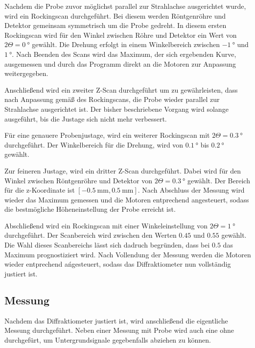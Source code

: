 Nachdem die Probe zuvor möglichst parallel zur Strahlachse ausgerichtet wurde,
wird ein Rockingscan durchgeführt. Bei diesem werden Röntgenröhre und
Detektor gemeinsam symmetrisch um die Probe gedreht. In diesem ersten
Rockingscan wird für den Winkel zwischen Röhre und Detektor ein Wert von
$2\Theta = \SI{0}{\degree}$ gewählt. Die Drehung erfolgt in einem Winkelbereich
zwischen $\SI{-1}{\degree}$ und $\SI{1}{\degree}$. Nach Beenden des Scans wird
das Maximum, der sich ergebenden Kurve, ausgemessen und durch das Programm direkt
an die Motoren zur Anpassung weitergegeben.


Anschließend wird ein zweiter Z-Scan durchgeführt um zu gewährleisten, dass
nach Anpassung gemäß des Rockingscans, die Probe wieder parallel zur Strahlachse
ausgerichtet ist. Der bisher
beschriebene Vorgang wird solange ausgeführt, bis die Justage sich nicht mehr
verbessert.



Für eine genauere Probenjustage, wird ein weiterer Rockingscan mit
$2\Theta = \SI{0.3}{\degree}$ durchgeführt. Der Winkelbereich für die Drehung,
wird von $\SI{0.1}{\degree}$ bis $\SI{0.2}{\degree}$ gewählt.


Zur feineren Justage, wird ein dritter Z-Scan durchgeführt.
Dabei wird für den Winkel zwischen Röntgenröhre und Detektor von
$2\Theta = \SI{0.3}{\degree}$ gewählt. Der Bereich für die z-Koordinate
ist $[\SI{-0.5}{\milli\meter}, \SI{0.5}{\milli\meter}]$.
Nach Abschluss der Messung wird wieder das Maximum gemessen und
die Motoren entprechend angesteuert, sodass die bestmögliche Höheneinstellung
der Probe erreicht ist.


Abschließend wird ein Rockingscan mit einer Winkeleinstellung von
$2\Theta = \SI{1}{\degree}$ durchgeführt. Der Scanbereich wird zwischen den Werten
$0.45$ und $0.55$ gewählt. Die Wahl dieses Scanbereichs lässt sich dadruch begründen,
dass bei $0.5$ das Maximum prognostiziert wird. Nach Vollendung der Messung
werden die Motoren wieder entprechend ańgesteuert, sodass das Diffraktiometer
nun vollständig justiert ist.



\subsection{Messung}
\label{subsec:messung}
Nachdem das Diffraktiometer justiert ist, wird anschließend
die eigentliche Messung durchgeführt.
Neben einer Messung mit Probe wird auch eine ohne durchgefürt,
um Untergrundsignale gegebenfalls abziehen zu können.

